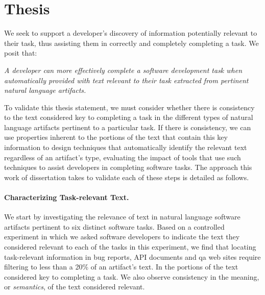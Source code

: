 

\section{Thesis}
\label{cp1:thesis}



We seek to support a developer's discovery of information potentially relevant to their task, thus assisting
them in correctly and completely completing a task. 
We posit that:

\medskip
\begin{bluequote}
    \textit{A developer can more effectively complete a software development task when automatically provided with text relevant to their task extracted from pertinent natural language artifacts.}
\end{bluequote}





To validate this thesis statement, 
we must consider whether there is consistency to 
the text 
considered key to completing a task
in the different types of natural language artifacts pertinent to a particular task.
If there is consistency, we can use properties inherent 
to the portions of the text that contain this key information 
to design techniques that automatically identify the relevant text
regardless of an artifact's type, evaluating the impact of tools that use such techniques to assist developers in completing software tasks. 
The approach this work of dissertation takes to validate each of these steps is detailed as follows.



\paragraph{\textbf{Characterizing Task-relevant Text.}} 


We start by investigating the relevance of text in natural language software artifacts
pertinent to six distinct software tasks.
Based on a controlled experiment in which we asked software developers to 
indicate the text they considered relevant to each of the tasks in this experiment,
we find that 
locating task-relevant information in bug
reports, API documents and \acf{qa} web sites require filtering
to less than a 20\% of an artifact's text.
In 
the portions of the text 
considered key to completing a task. We also 
observe consistency in the meaning, or \textit{semantics}, of the
 text considered relevant.



